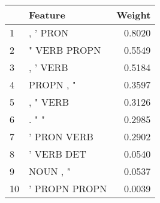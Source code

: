 \begin{tabular}{llr}
\toprule
{} &        Feature &  Weight \\
\midrule
1  &       , ' PRON &  0.8020 \\
2  &   " VERB PROPN &  0.5549 \\
3  &       , ' VERB &  0.5184 \\
4  &      PROPN , " &  0.3597 \\
5  &       , " VERB &  0.3126 \\
6  &          . " " &  0.2985 \\
7  &    ' PRON VERB &  0.2902 \\
8  &     ' VERB DET &  0.0540 \\
9  &       NOUN , " &  0.0537 \\
10 &  ' PROPN PROPN &  0.0039 \\
\bottomrule
\end{tabular}
